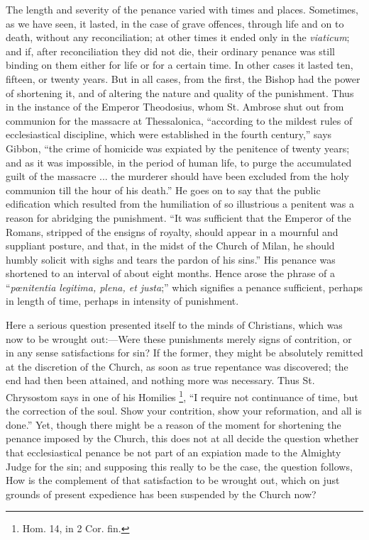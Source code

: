The length and severity of the penance varied with times and
places. Sometimes, as we have seen, it lasted, in the case of grave
offences, through life and on to death, without any reconciliation; at
other times it ended only in the \emph{viaticum}; and if, after
reconciliation they did not die, their ordinary penance was still
binding on them either for life or for a certain time. In other cases
it lasted ten, fifteen, or twenty years. But in all cases, from the
first, the Bishop had the power of shortening it, and of altering the
nature and quality of the punishment. Thus in the instance of the
Emperor Theodosius, whom St. Ambrose shut out from communion for the
massacre at Thessalonica, ``according to the mildest rules of
ecclesiastical discipline, which were established in the fourth
century,'' says Gibbon, ``the crime of homicide was expiated
by the penitence of twenty years; and as it was impossible, in the
period of human life, to purge the accumulated guilt of the massacre
... the murderer should have been excluded from the holy communion
till the hour of his death.'' He goes on to say that the public
edification which resulted from the humiliation of so illustrious a
penitent was a reason for abridging the punishment. ``It was
sufficient that the Emperor of the Romans, stripped of the ensigns of
royalty, should appear in a mournful and suppliant posture, and that,
in the midst of the Church of Milan, he should humbly solicit with
sighs and tears the pardon of his sins.'' His penance was
shortened to an interval of about eight months. Hence arose the phrase
of a ``\emph{pœnitentia
legitima, plena, et justa};'' which
signifies a penance sufficient, perhaps in length of time, perhaps in
intensity of punishment.


Here a serious question presented itself to the minds of
Christians, which was now to be wrought out:—Were these punishments
merely signs of contrition, or in any sense satisfactions for sin? If
the former, they might be absolutely remitted at the discretion of the
Church, as soon as true repentance was discovered; the end had then
been attained, and nothing more was necessary. Thus St. Chrysostom
says in one of his Homilies \footnote{Hom. 14, in 2 Cor. fin.}, ``I require not continuance
of time, but the correction of the soul. Show your contrition, show
your reformation, and all is done.'' Yet, though there might be a
reason of the moment for shortening the penance imposed by the Church,
this does not at all decide the question whether that ecclesiastical
penance be not part of an expiation made to the Almighty Judge for the
sin; and supposing this really to be the case, the question follows,
How is the complement of that satisfaction to be wrought out, which on
just grounds of present expedience has been suspended by the Church
now?

